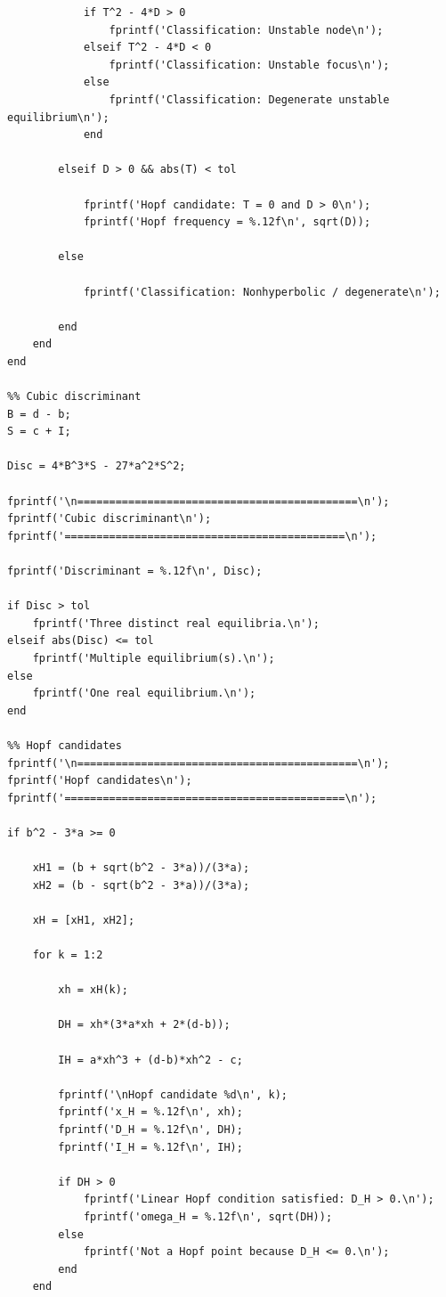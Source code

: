 \documentclass[11pt,a4paper]{article}
\begin{document}
\begin{verbatim}
            if T^2 - 4*D > 0
                fprintf('Classification: Unstable node\n');
            elseif T^2 - 4*D < 0
                fprintf('Classification: Unstable focus\n');
            else
                fprintf('Classification: Degenerate unstable equilibrium\n');
            end

        elseif D > 0 && abs(T) < tol

            fprintf('Hopf candidate: T = 0 and D > 0\n');
            fprintf('Hopf frequency = %.12f\n', sqrt(D));

        else

            fprintf('Classification: Nonhyperbolic / degenerate\n');

        end
    end
end

%% Cubic discriminant
B = d - b;
S = c + I;

Disc = 4*B^3*S - 27*a^2*S^2;

fprintf('\n============================================\n');
fprintf('Cubic discriminant\n');
fprintf('============================================\n');

fprintf('Discriminant = %.12f\n', Disc);

if Disc > tol
    fprintf('Three distinct real equilibria.\n');
elseif abs(Disc) <= tol
    fprintf('Multiple equilibrium(s).\n');
else
    fprintf('One real equilibrium.\n');
end

%% Hopf candidates
fprintf('\n============================================\n');
fprintf('Hopf candidates\n');
fprintf('============================================\n');

if b^2 - 3*a >= 0

    xH1 = (b + sqrt(b^2 - 3*a))/(3*a);
    xH2 = (b - sqrt(b^2 - 3*a))/(3*a);

    xH = [xH1, xH2];

    for k = 1:2

        xh = xH(k);

        DH = xh*(3*a*xh + 2*(d-b));

        IH = a*xh^3 + (d-b)*xh^2 - c;

        fprintf('\nHopf candidate %d\n', k);
        fprintf('x_H = %.12f\n', xh);
        fprintf('D_H = %.12f\n', DH);
        fprintf('I_H = %.12f\n', IH);

        if DH > 0
            fprintf('Linear Hopf condition satisfied: D_H > 0.\n');
            fprintf('omega_H = %.12f\n', sqrt(DH));
        else
            fprintf('Not a Hopf point because D_H <= 0.\n');
        end
    end


\end{verbatim}
\end{document}
